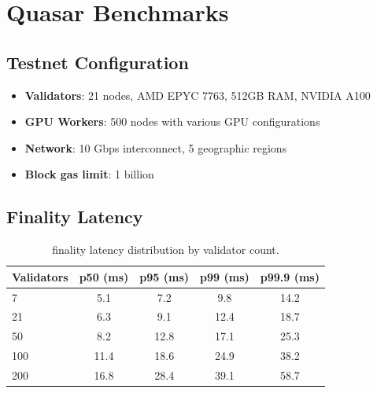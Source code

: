 \section{Quasar Benchmarks}

\label{sec:quasar-bench}

\subsection{Testnet Configuration}

\begin{itemize}
    \item \textbf{Validators}: 21 nodes, AMD EPYC 7763, 512GB RAM, NVIDIA A100
    \item \textbf{GPU Workers}: 500 nodes with various GPU configurations
    \item \textbf{Network}: 10 Gbps interconnect, 5 geographic regions
    \item \textbf{Block gas limit}: 1 billion
\end{itemize}

\subsection{Finality Latency}

\begin{table}[t]
\centering
\begin{tabular}{lcccc}
\toprule
\textbf{Validators} & \textbf{p50 (ms)} & \textbf{p95 (ms)} & \textbf{p99 (ms)} & \textbf{p99.9 (ms)} \\
\midrule
7 & 5.1 & 7.2 & 9.8 & 14.2 \\
21 & 6.3 & 9.1 & 12.4 & 18.7 \\
50 & 8.2 & 12.8 & 17.1 & 25.3 \\
100 & 11.4 & 18.6 & 24.9 & 38.2 \\
200 & 16.8 & 28.4 & 39.1 & 58.7 \\
\bottomrule
\end{tabular}
\caption{\Quasar{} finality latency distribution by validator count.}
\label{tab:finality}
\end{table}

